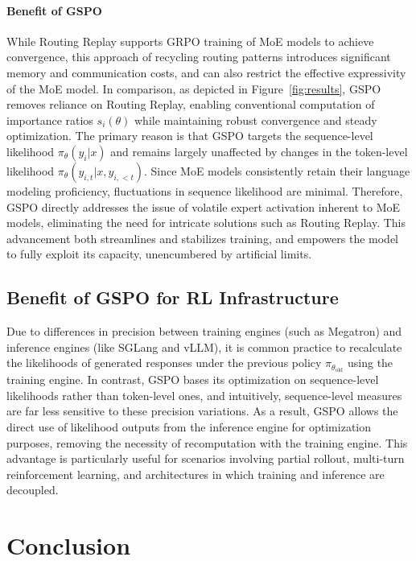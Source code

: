 \paragraph{Benefit of GSPO} While Routing Replay supports GRPO training of MoE models to achieve convergence, this approach of recycling routing patterns introduces significant memory and communication costs, and can also restrict the effective expressivity of the MoE model. In comparison, as depicted in Figure~\ref{fig:results}, GSPO removes reliance on Routing Replay, enabling conventional computation of importance ratios $s_i(\theta)$ while maintaining robust convergence and steady optimization. The primary reason is that GSPO targets the sequence-level likelihood $\pi_{\theta} (y_i | x)$ and remains largely unaffected by changes in the token-level likelihood $\pi_{\theta} (y_{i,t} | x, y_{i,<t})$. Since MoE models consistently retain their language modeling proficiency, fluctuations in sequence likelihood are minimal. Therefore, GSPO directly addresses the issue of volatile expert activation inherent to MoE models, eliminating the need for intricate solutions such as Routing Replay. This advancement both streamlines and stabilizes training, and empowers the model to fully exploit its capacity, unencumbered by artificial limits.

\subsection{Benefit of GSPO for RL Infrastructure}

Due to differences in precision between training engines (such as Megatron) and inference engines (like SGLang and vLLM), it is common practice to recalculate the likelihoods of generated responses under the previous policy $\pi_{\theta_\text{old}}$ using the training engine. In contrast, GSPO bases its optimization on sequence-level likelihoods rather than token-level ones, and intuitively, sequence-level measures are far less sensitive to these precision variations. As a result, GSPO allows the direct use of likelihood outputs from the inference engine for optimization purposes, removing the necessity of recomputation with the training engine. This advantage is particularly useful for scenarios involving partial rollout, multi-turn reinforcement learning, and architectures in which training and inference are decoupled.

\section{Conclusion}

